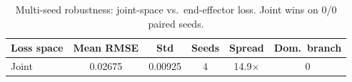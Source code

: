 \begin{table}
  \centering
  \caption{Multi-seed robustness: joint-space vs.\ end-effector loss. Joint wins on 0/0 paired seeds.}
  \label{tab:robustness}
  \begin{tabular}{lccccc}
    \toprule
    Loss space & Mean RMSE & Std & Seeds & Spread & Dom.\ branch \\
    \midrule
    Joint & 0.02675 & 0.00925 & 4 & 14.9$\times$ & 0 \\
    \bottomrule
  \end{tabular}
\end{table}
